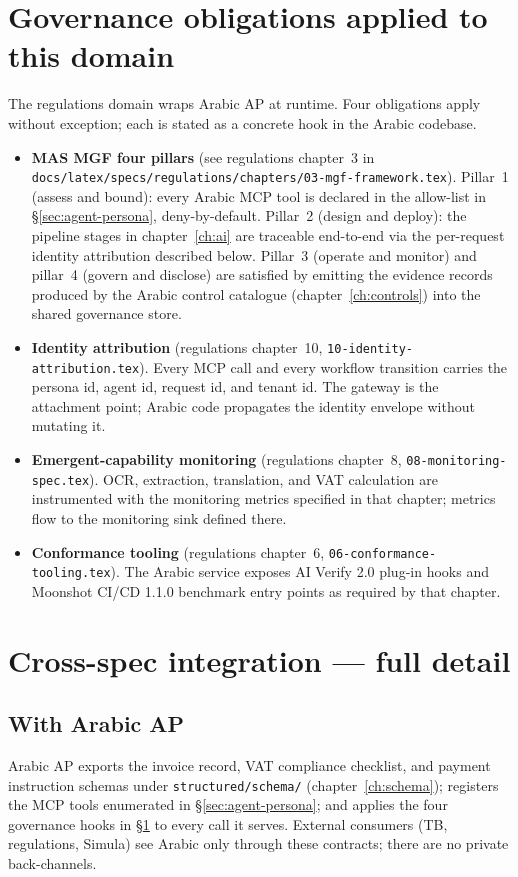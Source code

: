 \section{Governance obligations applied to this domain}
\label{sec:agent-governance}
The regulations domain wraps Arabic AP at runtime. Four obligations
apply without exception; each is stated as a concrete hook in the
Arabic codebase.

\begin{itemize}
  \item \textbf{MAS MGF four pillars} (see regulations
    chapter~3 in \texttt{docs/latex/specs/regulations/chapters/03-mgf-framework.tex}).
    Pillar~1 (assess and bound): every Arabic MCP tool is declared in
    the allow-list in \S\ref{sec:agent-persona}, deny-by-default.
    Pillar~2 (design and deploy): the pipeline stages in
    chapter~\ref{ch:ai} are traceable end-to-end via the
    per-request identity attribution described below. Pillar~3
    (operate and monitor) and pillar~4 (govern and disclose) are
    satisfied by emitting the evidence records produced by the
    Arabic control catalogue (chapter~\ref{ch:controls}) into the
    shared governance store.
  \item \textbf{Identity attribution} (regulations chapter~10,
    \texttt{10-identity-attribution.tex}). Every MCP call and every
    workflow transition carries the persona id, agent id, request
    id, and tenant id. The gateway is the attachment point; Arabic
    code propagates the identity envelope without mutating it.
  \item \textbf{Emergent-capability monitoring} (regulations
    chapter~8, \texttt{08-monitoring-spec.tex}). OCR, extraction,
    translation, and VAT calculation are instrumented with the
    monitoring metrics specified in that chapter; metrics flow to
    the monitoring sink defined there.
  \item \textbf{Conformance tooling} (regulations chapter~6,
    \texttt{06-conformance-tooling.tex}). The Arabic service exposes
    AI Verify 2.0 plug-in hooks and Moonshot CI/CD 1.1.0 benchmark
    entry points as required by that chapter.
\end{itemize}

\section{Cross-spec integration --- full detail}
\label{sec:agent-integration}

\subsection{With Arabic AP}
Arabic AP exports the invoice record, VAT compliance checklist, and
payment instruction schemas under \texttt{structured/schema/}
(chapter~\ref{ch:schema}); registers the MCP tools enumerated in
\S\ref{sec:agent-persona}; and applies the four governance hooks in
\S\ref{sec:agent-governance} to every call it serves. External
consumers (TB, regulations, Simula) see Arabic only through these
contracts; there are no private back-channels.

